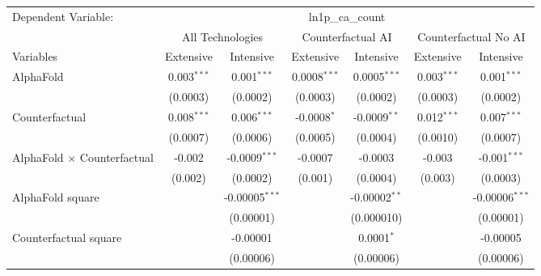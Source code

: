 \begingroup
\centering
\begin{tabular}{lcccccc}
   \tabularnewline \midrule \midrule
   Dependent Variable: & \multicolumn{6}{c}{ln1p\_ca\_count}\\
 & \multicolumn{2}{c}{All Technologies} & \multicolumn{2}{c}{Counterfactual AI} & \multicolumn{2}{c}{Counterfactual No AI} \\
\cmidrule(lr){1-1}\cmidrule(lr){2-3} \cmidrule(lr){4-5} \cmidrule(lr){6-7}
Variables & \multicolumn{1}{c}{Extensive} & \multicolumn{1}{c}{Intensive} & \multicolumn{1}{c}{Extensive} & \multicolumn{1}{c}{Intensive} & \multicolumn{1}{c}{Extensive} & \multicolumn{1}{c}{Intensive} \\
\cmidrule(lr){1-1}\cmidrule(lr){2-2} \cmidrule(lr){3-3} \cmidrule(lr){4-4} \cmidrule(lr){5-5} \cmidrule(lr){6-6} \cmidrule(lr){7-7}
   AlphaFold                          & 0.003$^{***}$ & 0.001$^{***}$    & 0.0008$^{***}$ & 0.0005$^{***}$  & 0.003$^{***}$ & 0.001$^{***}$\\   
                                      & (0.0003)      & (0.0002)         & (0.0003)       & (0.0002)        & (0.0003)      & (0.0002)\\   
   Counterfactual                     & 0.008$^{***}$ & 0.006$^{***}$    & -0.0008$^{*}$  & -0.0009$^{**}$  & 0.012$^{***}$ & 0.007$^{***}$\\   
                                      & (0.0007)      & (0.0006)         & (0.0005)       & (0.0004)        & (0.0010)      & (0.0007)\\   
   AlphaFold $\times$ Counterfactual  & -0.002        & -0.0009$^{***}$  & -0.0007        & -0.0003         & -0.003        & -0.001$^{***}$\\   
                                      & (0.002)       & (0.0002)         & (0.001)        & (0.0004)        & (0.003)       & (0.0003)\\   
   AlphaFold square                   &               & -0.00005$^{***}$ &                & -0.00002$^{**}$ &               & -0.00006$^{***}$\\   
                                      &               & (0.00001)        &                & (0.000010)      &               & (0.00001)\\   
   Counterfactual square              &               & -0.00001         &                & 0.0001$^{*}$    &               & -0.00005\\   
                                      &               & (0.00006)        &                & (0.00006)       &               & (0.00006)\\   

\end{tabular}
